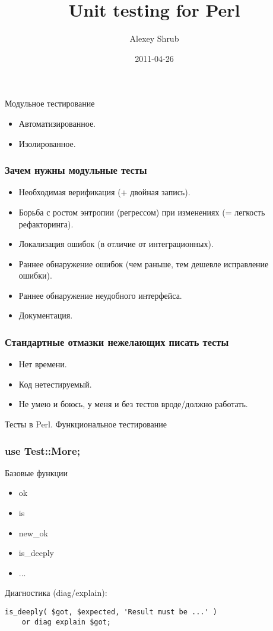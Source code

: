 \documentclass[aspectratio=169]{beamer}
\title{Unit testing for Perl}
\author{Alexey Shrub}
\institute{Российские интернет-технологии}
\date{2011-04-26}
\begin{document}
\maketitle

\begin{frame}{Модульное тестирование}
\begin{itemize}
\item Автоматизированное.
\item Изолированное.
\end{itemize}
\end{frame}

\begin{frame}
\frametitle{Зачем нужны модульные тесты}
\begin{itemize}
\item Необходимая верификация (+ двойная запись).
\pause
\item Борьба с ростом энтропии (регрессом) при изменениях (= легкость рефакторинга).
\pause
\item Локализация ошибок (в отличие от интеграционных).
\pause
\item Раннее обнаружение ошибок (чем раньше, тем дешевле исправление ошибки).
\pause
\item Раннее обнаружение неудобного интерфейса.
\pause
\item Документация.
\end{itemize}
\end{frame}

\begin{frame}
\frametitle{Стандартные отмазки нежелающих писать тесты}
\begin{itemize}
\item Нет времени.
\item Код нетестируемый.
\item Не умею и боюсь, у меня и без тестов вроде/должно работать.
\end{itemize}
\end{frame}

\begin{frame}
\begin{center}
Тесты в Perl. Функциональное тестирование
\end{center}
\end{frame}

\begin{frame}[fragile]
\frametitle{use Test::More;}
Базовые функции
\begin{itemize}
\item ok
\item is
\item new\_ok
\item is\_deeply
\item ...
\end{itemize}
Диагностика (diag/explain):
\begin{lstlisting}
is_deeply( $got, $expected, 'Result must be ...' )
    or diag explain $got;
\end{lstlisting}
\end{frame}
\end{document}

